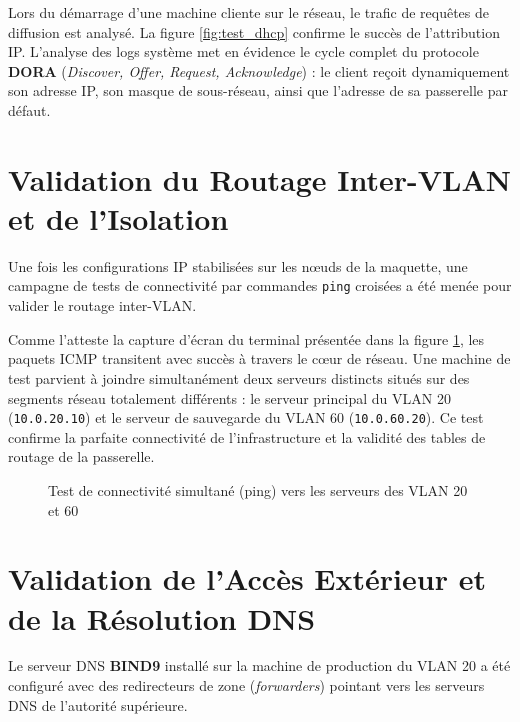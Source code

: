 Lors du démarrage d'une machine cliente sur le réseau, le trafic de requêtes de diffusion est analysé. La figure \ref{fig:test_dhcp} confirme le succès de l'attribution IP. L'analyse des logs système met en évidence le cycle complet du protocole \textbf{DORA} (\textit{Discover, Offer, Request, Acknowledge}) : le client reçoit dynamiquement son adresse IP, son masque de sous-réseau, ainsi que l'adresse de sa passerelle par défaut.


\section{Validation du Routage Inter-VLAN et de l'Isolation}
Une fois les configurations IP stabilisées sur les nœuds de la maquette, une campagne de tests de connectivité par commandes \texttt{ping} croisées a été menée pour valider le routage inter-VLAN.

Comme l'atteste la capture d'écran du terminal présentée dans la figure \ref{fig:test_intervlan}, les paquets ICMP transitent avec succès à travers le cœur de réseau. Une machine de test parvient à joindre simultanément deux serveurs distincts situés sur des segments réseau totalement différents : le serveur principal du VLAN 20 (\texttt{10.0.20.10}) et le serveur de sauvegarde du VLAN 60 (\texttt{10.0.60.20}). Ce test confirme la parfaite connectivité de l'infrastructure et la validité des tables de routage de la passerelle.

\begin{figure}[H]
    \centering
    \caption{Test de connectivité simultané (ping) vers les serveurs des VLAN 20 et 60}
    \label{fig:test_intervlan}
\end{figure}

\section{Validation de l'Accès Extérieur et de la Résolution DNS}
Le serveur DNS \textbf{BIND9} installé sur la machine de production du VLAN 20 a été configuré avec des redirecteurs de zone (\textit{forwarders}) pointant vers les serveurs DNS de l'autorité supérieure. 

